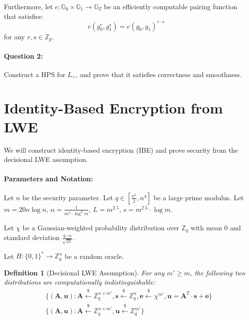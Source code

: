 \documentclass[11pt]{article}
\newtheorem{definition}[theorem]{Definition}
\newenvironment{solution}{\color{blue}\noindent{\bf Solution}\hspace*{1em}}{\qed\medskip}
\newcommand{\qed}{\mbox{}\hspace*{\fill}\nolinebreak\mbox{$\rule{0.6em}{0.6em}$}} %
\numberwithin{equation}{section}
\newcommand{\bfe}{\mathbf{e}}
\newcommand{\bfs}{\mathbf{s}}
\newcommand{\bfu}{\mathbf{u}}
\newcommand{\bfA}{\mathbf{A}}
\newcommand{\bbG}{\mathbb{G}}
\newcommand{\bbZ}{\mathbb{Z}}
\newcommand{\getsr}{\stackrel{\$}{\gets}}
\newcommand{\bin}{\{0,1\}}
\newcommand{\bit}{\bin}
\newif\ifsol
\begin{document}
Furthermore, let $e : \bbG_0 \times \bbG_1 \to \bbG_T$ be an efficiently computable pairing function that satisfies:
\[e(g_0^r, g_1^s) = e(g_0, g_1)^{r \cdot s}\]
for any $r, s \in \bbZ_p$.

\paragraph{Question 2:} Construct a HPS for $L_\lor$, and prove that it satisfies correctness and smoothness.

\ifsol
\vspace{5mm}
\begin{solution}
TBD
\end{solution}
\fi


\section{Identity-Based Encryption from LWE}
We will construct identity-based encryption (IBE) and prove security from the decisional LWE assumption.

\paragraph{Parameters and Notation:} 
Let $n$ be the security parameter. Let $q \in [\frac{n^4}{2}, n^4]$ be a large prime modulus. Let $m = 20 n \log n$, $\alpha = \frac{1}{m^4 \cdot \log^2 m}$, $L = m^{2.5}$, $s = m^{2.5} \cdot \log m$.

Let $\chi$ be a Gaussian-weighted probability distribution over $\bbZ_q$ with mean $0$ and standard deviation $\frac{q \cdot \alpha}{\sqrt{2 \pi}}$.

Let $H:\bit^* \to \bbZ_q^n$ be a random oracle. 

\begin{definition}[Decisional LWE Assumption]\label{def:decisional-LWE-assumption}
    For any $m' \geq m$, the following two distributions are computationally indistinguishable:
    \begin{align*}
        &\{(\bfA, \bfu) : \bfA \getsr \bbZ_q^{n \times m'}, \bfs \getsr \bbZ_q^{n}, \bfe \getsr \chi^{m'}, \bfu = \bfA^T \cdot \bfs + \bfe\}\\
        &\{(\bfA, \bfu) : \bfA \getsr \bbZ_q^{n \times m'}, \bfu \getsr \bbZ_q^{m'}\}
    \end{align*}
\end{definition}
\end{document}
